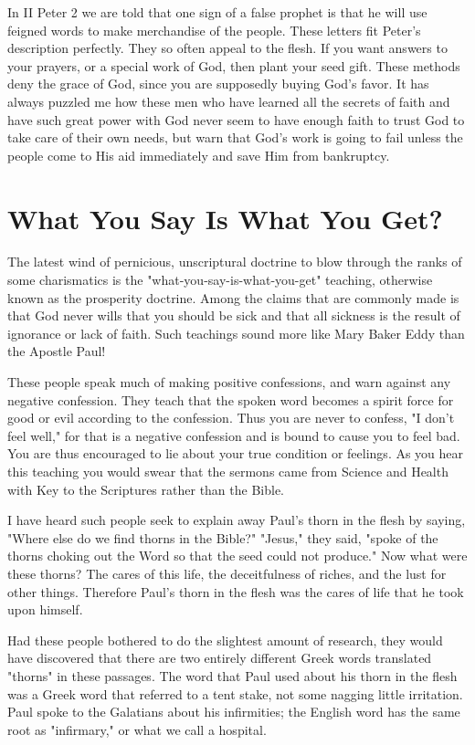 In II Peter 2 we are told that one sign of a false prophet is that he will use feigned words to make merchandise of the people. These letters fit Peter's description perfectly. They so often appeal to the flesh. If you want answers to your prayers, or a special work of God, then plant your seed gift. These methods deny the grace of God, since you are supposedly buying God's favor. It has always puzzled me how these men who have learned all the secrets of faith and have such great power with God never seem to have enough faith to trust God to take care of their own needs, but warn that God's work is going to fail unless the people come to His aid immediately and save Him from bankruptcy. 

\section*{What You Say Is What You Get?}

The latest wind of pernicious, unscriptural doctrine to blow through the ranks of some charismatics is the "what-you-say-is-what-you-get" teaching, otherwise known as the prosperity doctrine. Among the claims that are commonly made is that God never wills that you should be sick and that all sickness is the result of ignorance or lack of faith. Such teachings sound more like Mary Baker Eddy than the Apostle Paul! 

These people speak much of making positive confessions, and warn against any negative confession. They teach that the spoken word becomes a spirit force for good or evil according to the confession. Thus you are never to confess, "I don't feel well," for that is a negative confession and is bound to cause you to feel bad. You are thus encouraged to lie about your true condition or feelings. As you hear this teaching you would swear that the sermons came from Science and Health with Key to the Scriptures rather than the Bible. 

I have heard such people seek to explain away Paul's thorn in the flesh by saying, "Where else do we find thorns in the Bible?" "Jesus," they said, "spoke of the thorns choking out the Word so that the seed could not produce." Now what were these thorns? The cares of this life, the deceitfulness of riches, and the lust for other things. Therefore Paul's thorn in the flesh was the cares of life that he took upon himself. 

Had these people bothered to do the slightest amount of research, they would have discovered that there are two entirely different Greek words translated "thorns" in these passages. The word that Paul used about his thorn in the flesh was a Greek word that referred to a tent stake, not some nagging little irritation. Paul spoke to the Galatians about his infirmities; the English word has the same root as "infirmary," or what we call a hospital. 

